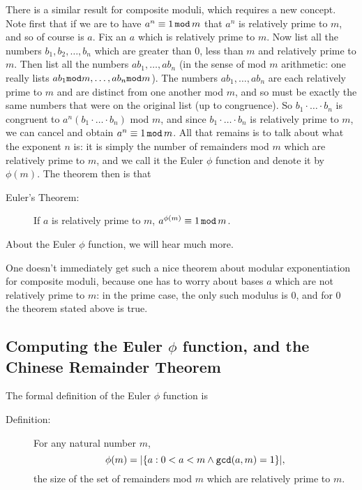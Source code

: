 \documentclass[12pt]{article}
\begin{document}
There is a similar result for composite moduli, which requires a new concept.  Note first that if we are to have $a^n\equiv 1 \,{\tt mod}\,m$
that $a^n$ is relatively prime to $m$, and so of course is $a$.   Fix an $a$ which is relatively prime to $m$.   Now list all the numbers $b_1,b_2,\ldots,b_n$ which
are greater than 0, less than $m$ and relatively prime to $m$.  Then list all the numbers $ab_1,\ldots,ab_n$ (in the sense of mod $m$ arithmetic:  one really lists  $ab_1{\tt mod}m,\ldots,ab_n{\tt mod}m$).
The numbers $ab_1,\ldots,ab_n$ are each relatively prime to $m$ and are distinct from one another mod $m$,
and so must be exactly the same numbers that were on the original list (up to congruence).   So $b_1\cdot \ldots \cdot b_n$ is congruent to
$a^n(b_1\cdot \ldots \cdot b_n)$ mod $m$, and since $b_1\cdot \ldots \cdot b_n$ is relatively prime to $m$,
we can cancel and obtain $a^n \equiv 1\,{\tt mod}\,m$.   All that remains is to talk about what the exponent $n$ is:
it is simply the number of remainders mod $m$ which are relatively prime to $m$, and we call it the Euler $\phi$ function
and denote it by $\phi(m)$.  The theorem then is that


\begin{description}

 \item[Euler's Theorem:]  If $a$ is relatively prime to $m$, $a^{\phi(m)}\equiv 1\,{\tt mod}\,m$.

\end{description}

About the Euler $\phi$ function, we will hear much more.

One doesn't immediately get such a nice theorem about modular exponentiation for composite moduli, because one has to worry about bases $a$ which
are not relatively prime to $m$:  in the prime case, the only such modulus is 0, and for 0 the theorem stated above is true.

\subsection{Computing the Euler $\phi$ function, and the Chinese Remainder Theorem}

The formal definition of the Euler $\phi$ function is

\begin{description}

\item[Definition:]  For any natural number $m$, $$\phi(m)=|\{a : 0<a<m \wedge {\tt gcd}(a,m)=1\}|,$$ the size of the set of remainders mod $m$ which are relatively prime to $m$.

\end{description}
\end{document}

